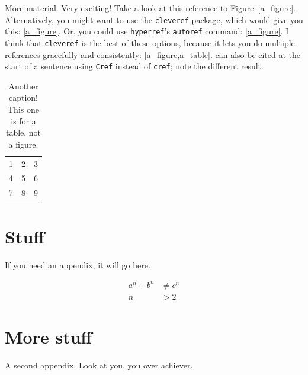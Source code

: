 \documentclass[letterpaper,12pt]{yalephd}
\begin{document}
More material. Very exciting! Take a look at this reference to Figure~\ref{a_figure}.
Alternatively, you might want to use the \texttt{cleveref} package, which would give you this: \cref{a_figure}.
Or, you could use \texttt{hyperref}'s \texttt{autoref} command: \autoref{a_figure}.
I think that \texttt{cleveref} is the best of these options, because it lets you do multiple references gracefully and consistently: \cref{a_figure,a_table}.
 can also be cited at the start of a sentence using \texttt{Cref} instead of \texttt{cref}; note the different result.

\begin{table}
\centering
\begin{tabular}{c|c|c}
 1 & 2 & 3 \\
 4 & 5 & 6 \\
 7 & 8 & 9 \\
\hline
\end{tabular}
\caption[Short caption for the list of tables]{Another caption! This one is for a table, not a figure.}
\label{a_table}
\end{table}


\appendix

\chapter{Stuff}
If you need an appendix, it will go here.

\begin{align}
a^n + b^n &\ne c^n \\
n &> 2
\end{align}

\chapter{More stuff}
A second appendix. Look at you, you over achiever.

\backmatter


\end{document}
